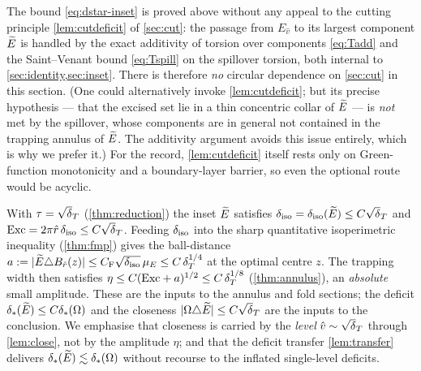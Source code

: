 \begin{remark}
\label{rem:fwd}
The bound \eqref{eq:dstar-inset} is proved above without any appeal to the
cutting principle \cref{lem:cutdeficit} of \cref{sec:cut}: the passage from
$E_{\hat v}$ to its largest component $\widetilde{E}$ is handled by the exact
additivity of torsion over components \eqref{eq:Tadd} and the Saint--Venant
bound \eqref{eq:Tspill} on the spillover torsion, both internal to
\cref{sec:identity,sec:inset}. There is therefore \emph{no} circular
dependence on \cref{sec:cut} in this section. (One could alternatively invoke
\cref{lem:cutdeficit}; but its precise hypothesis --- that the excised set lie
in a thin concentric collar of $\widetilde{E}$ --- is \emph{not} met by the spillover,
whose components are in general not contained in the trapping annulus of
$\widetilde{E}$. The additivity argument avoids this issue entirely, which is why we
prefer it.) For the record, \cref{lem:cutdeficit} itself rests only on
Green-function monotonicity and a boundary-layer barrier, so even the optional
route would be acyclic.
\end{remark}

\begin{remark}\label{rem:scales}
With $\tau=\sqrt\dT$ (\cref{thm:reduction}) the inset $\widetilde{E}$ satisfies
$\diso=\diso(\Etil)\le C\sqrt\dT$ and $\Exc=2\pi\hat r\,\diso\le C\sqrt\dT$.
Feeding $\delta_{\mathrm{iso}}$ into the sharp quantitative isoperimetric inequality
(\cref{thm:fmp}) gives the ball-distance
$a:=|\widetilde{E}\triangle B_{\hat r}(z)|\le C_{\mathrm F}\sqrt{\delta_{\mathrm{iso}}}\,\mu_E\le
C\,\delta_T^{1/4}$ at the optimal centre $z$. The trapping width then satisfies
$\eta\le C(\mathrm{Exc}+a)^{1/2}\le C\,\delta_T^{1/8}$ (\cref{thm:annulus}), an
\emph{absolute} small amplitude. These are the inputs to the annulus and
fold sections; the deficit $\delta_{*}(\widetilde{E})\le C\delta_{*}(\Omega)$ and the closeness
$|\Om\triangle\Etil|\le C\sqrt\dT$ are the inputs to the conclusion. We
emphasise that closeness is carried by the \emph{level} $\hat v\sim\sqrt\dT$
through \cref{lem:close}, not by the amplitude $\eta$; and that the deficit
transfer \cref{lem:transfer} delivers $\delta_{*}(\widetilde{E})\lesssim\delta_{*}(\Omega)$
without recourse to the inflated single-level deficits.
\end{remark}
